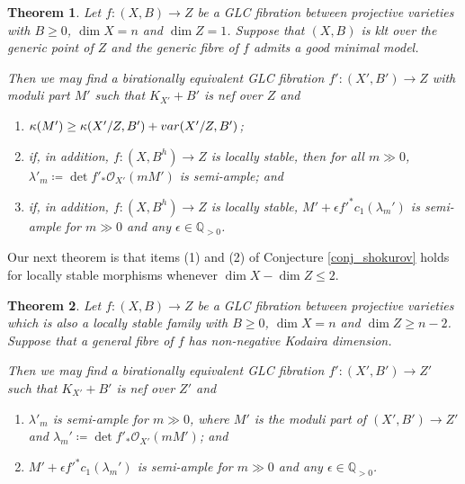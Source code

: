 \documentclass[12pt]{amsart}
\theoremstyle{plain}
\newtheorem{theorem}{Theorem}[section]
\theoremstyle{definition}
\def\dim{\operatorname{dim}}
\def\det{\operatorname{det}}
\def \QP {\mathbb Q_{>0}}
\begin{document}
\begin{theorem}
Let $f\colon (X, B) \rightarrow Z$ be a GLC fibration between projective varieties
with $B \geq 0$, $\dim X= n$ and $\dim Z = 1$.
Suppose that
$(X, B)$ is klt over the generic point of $Z$ and the generic fibre of $f$ admits a good minimal model.

	Then we may find a birationally equivalent GLC fibration $f'\colon (X', B') \rightarrow Z$ with moduli part $M'$ such that $K_{X'}+B'$ is nef over $Z$ and 
	\begin{enumerate}
\item $\kappa(M') \geq \kappa(X'/Z, B')+{\rm var}(X'/Z, B')$; 

	\item if, in addition, $f\colon (X, B^h) \to Z$ is locally stable, then for all $m \gg 0$, $\lambda'_m \coloneqq \det f'_*\mathcal O_{X'}(mM')$ is semi-ample; and
	
	\item if, in addition, $f\colon (X, B^h) \to Z$ is locally stable, $M'+\epsilon f'^*c_1(\lambda_m')$ is semi-ample for $m\gg 0$ and any $\epsilon \in \QP$.


\end{enumerate}
\end{theorem}



Our next theorem is that items (1) and (2) of Conjecture \ref{conj_shokurov} 
holds for locally stable morphisms whenever $\dim X -\dim Z \leq 2$.


\begin{theorem}\label{intro_thm_surfaces}
Let $f\colon (X, B) \rightarrow Z$ be a GLC fibration between projective varieties which is also a locally stable family
with $B \geq 0$, $\dim X= n$ and $\dim Z \geq n-2$.
Suppose that a general fibre of $f$ has non-negative Kodaira dimension.

        Then we may find a birationally equivalent GLC fibration $f'\colon (X', B') \rightarrow Z'$
        such that $K_{X'}+B'$ is nef over $Z'$ and
	\begin{enumerate}
		\item $\lambda'_m$ is semi-ample for $m \gg 0$, where $M'$ is the moduli part of $(X', B')\rightarrow Z'$ and  $\lambda_m' \coloneqq \det f'_*\mathcal O_{X'}(mM')$; and 
		\item $M'+\epsilon f'^*c_1(\lambda_m')$ is semi-ample for $m\gg 0$ and any $\epsilon \in \QP$.
	\end{enumerate}
	\end{theorem}
\end{document}
